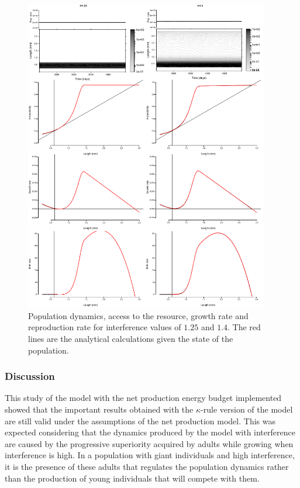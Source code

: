 \begin{figure}[!ht] %
\centering
\includegraphics[width=0.95\textwidth]{4_ChapThe1/Fig/FigSM10}
\caption[Sample simulation for I=1.25
and I=1.45 (net production model)]{Population dynamics, access to the resource,
growth rate and reproduction rate for interference values of $1.25$ and $1.4$. The red lines are
the analytical calculations given the state of the population.}
\label{Fig4-SM10}
\end{figure}

\subsubsection{Discussion}

This study of the model with the net production energy budget implemented showed
that the important results obtained with the $\kappa$-rule version of the model
are still valid under the assumptions of the net production model. This was expected
considering that the dynamics produced by the model with interference are caused
by the progressive superiority acquired by adults while growing when
interference is high. In a population with giant individuals and high
interference, it is the presence of these adults that regulates the population
dynamics rather than the production of young individuals that will compete with
them.


